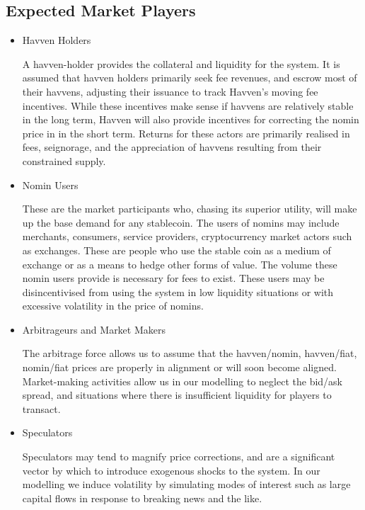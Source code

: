 \subsection{Expected Market Players}

\begin{itemize}
	\item{Havven Holders}

	A havven-holder provides the collateral and liquidity for the system.
	It is assumed that havven holders primarily seek fee revenues, and escrow most of their havvens,
	adjusting their issuance to track Havven's moving fee incentives.
	While these incentives make sense if havvens are relatively stable in the long term,
	Havven will also provide incentives for correcting the nomin price in in the short term.
	Returns for these actors are primarily realised in fees, seignorage, and the appreciation of havvens resulting
	from their constrained supply.

	\item{Nomin Users}

	These are the market participants who, chasing its superior utility, will make up the
	base demand for any stablecoin.
	The users of nomins may include merchants, consumers, service providers, cryptocurrency market actors
	such as exchanges. These are people who use the stable coin as a medium of
	exchange or as a means to hedge other forms of value.
	The volume these nomin users provide is necessary for fees to exist.
	These users may be disincentivised from using the system in low liquidity situations or with excessive volatility
	in the price of nomins.

	\item{Arbitrageurs and Market Makers}

	The arbitrage force allows us to assume that the havven/nomin, havven/fiat, nomin/fiat
	prices are properly in alignment or will soon become aligned. Market-making activities
	allow us in our modelling to neglect the bid/ask spread, and situations where there is insufficient
	liquidity for players to transact.
	
	\item{Speculators}
	
	Speculators may tend to magnify price corrections, and are a significant vector by which to introduce
	exogenous shocks to the system. In our modelling we induce volatility by simulating modes of interest
	such as large capital flows in response to breaking news and the like.
	
	

\end{itemize}
